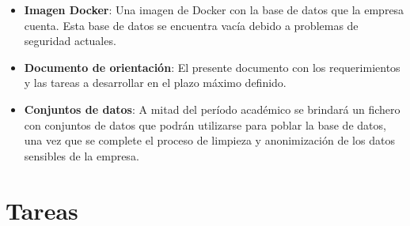 \documentclass[10pt]{article}
\begin{document}
	\begin{itemize}
		\item \textbf{Imagen Docker}: Una imagen de Docker con la base de datos que la empresa cuenta. Esta base de datos se encuentra vacía debido a problemas de seguridad actuales.
		
		\item \textbf{Documento de orientación}: El presente documento con los requerimientos y las tareas a desarrollar en el plazo máximo definido.
		
		\item \textbf{Conjuntos de datos}: A mitad del período académico se brindará un fichero con conjuntos de datos que podrán utilizarse para poblar la base de datos, una vez que se complete el proceso de limpieza y anonimización de los datos sensibles de la empresa.
	\end{itemize}
	
	\section*{Tareas}
	
\end{document}
